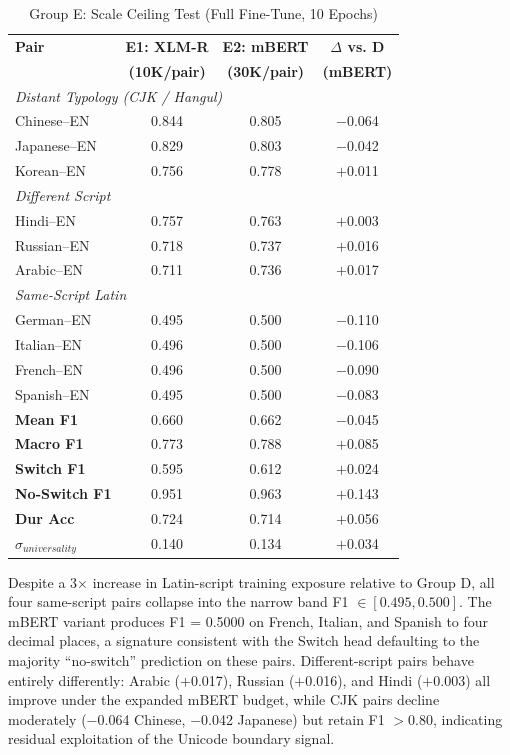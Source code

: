 \documentclass[sigconf,nonacm]{acmart}
\begin{document}
\begin{table}[h]
\centering
\small
\caption{Group E: Scale Ceiling Test (Full Fine-Tune, 10 Epochs)}
\label{tab:groupE}
\begin{tabular}{lccc}
\toprule
\textbf{Pair} & \textbf{E1: XLM-R} & \textbf{E2: mBERT} & \textbf{$\Delta$ vs. D} \\
 & \textbf{(10K/pair)} & \textbf{(30K/pair)} & \textbf{(mBERT)} \\
\midrule
\multicolumn{4}{l}{\textit{Distant Typology (CJK / Hangul)}} \\
Chinese--EN & 0.844 & 0.805 & $-$0.064 \\
Japanese--EN & 0.829 & 0.803 & $-$0.042 \\
Korean--EN & 0.756 & 0.778 & $+$0.011 \\
\midrule
\multicolumn{4}{l}{\textit{Different Script}} \\
Hindi--EN & 0.757 & 0.763 & $+$0.003 \\
Russian--EN & 0.718 & 0.737 & $+$0.016 \\
Arabic--EN & 0.711 & 0.736 & $+$0.017 \\
\midrule
\multicolumn{4}{l}{\textit{Same-Script Latin}} \\
German--EN & 0.495 & 0.500 & $-$0.110 \\
Italian--EN & 0.496 & 0.500 & $-$0.106 \\
French--EN & 0.496 & 0.500 & $-$0.090 \\
Spanish--EN & 0.495 & 0.500 & $-$0.083 \\
\midrule
\textbf{Mean F1} & 0.660 & 0.662 & $-$0.045 \\
\textbf{Macro F1} & 0.773 & 0.788 & $+$0.085 \\
\textbf{Switch F1} & 0.595 & 0.612 & $+$0.024 \\
\textbf{No-Switch F1} & 0.951 & 0.963 & $+$0.143 \\
\textbf{Dur Acc} & 0.724 & 0.714 & $+$0.056 \\
\textbf{$\sigma_{universality}$} & 0.140 & 0.134 & $+$0.034 \\
\bottomrule
\end{tabular}
\end{table}

Despite a 3$\times$ increase in Latin-script training exposure relative to Group D, all four same-script pairs collapse into the narrow band F1 $\in [0.495, 0.500]$. The mBERT variant produces F1 = 0.5000 on French, Italian, and Spanish to four decimal places, a signature consistent with the Switch head defaulting to the majority ``no-switch'' prediction on these pairs. Different-script pairs behave entirely differently: Arabic ($+$0.017), Russian ($+$0.016), and Hindi ($+$0.003) all improve under the expanded mBERT budget, while CJK pairs decline moderately ($-$0.064 Chinese, $-$0.042 Japanese) but retain F1 $> 0.80$, indicating residual exploitation of the Unicode boundary signal.
\end{document}
